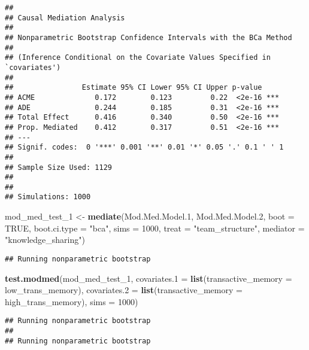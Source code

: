 \documentclass[]{article}
\newenvironment{Shaded}{\begin{snugshade}}{\end{snugshade}}
\newcommand{\DataTypeTok}[1]{\textcolor[rgb]{0.13,0.29,0.53}{#1}}
\newcommand{\DecValTok}[1]{\textcolor[rgb]{0.00,0.00,0.81}{#1}}
\newcommand{\FloatTok}[1]{\textcolor[rgb]{0.00,0.00,0.81}{#1}}
\newcommand{\KeywordTok}[1]{\textcolor[rgb]{0.13,0.29,0.53}{\textbf{#1}}}
\newcommand{\NormalTok}[1]{#1}
\newcommand{\OtherTok}[1]{\textcolor[rgb]{0.56,0.35,0.01}{#1}}
\newcommand{\StringTok}[1]{\textcolor[rgb]{0.31,0.60,0.02}{#1}}
\begin{document}
\begin{verbatim}
## 
## Causal Mediation Analysis 
## 
## Nonparametric Bootstrap Confidence Intervals with the BCa Method
## 
## (Inference Conditional on the Covariate Values Specified in `covariates')
## 
##                Estimate 95% CI Lower 95% CI Upper p-value    
## ACME              0.172        0.123         0.22  <2e-16 ***
## ADE               0.244        0.185         0.31  <2e-16 ***
## Total Effect      0.416        0.340         0.50  <2e-16 ***
## Prop. Mediated    0.412        0.317         0.51  <2e-16 ***
## ---
## Signif. codes:  0 '***' 0.001 '**' 0.01 '*' 0.05 '.' 0.1 ' ' 1
## 
## Sample Size Used: 1129 
## 
## 
## Simulations: 1000
\end{verbatim}

\begin{Shaded}
\begin{Highlighting}[]
\NormalTok{mod_med_test_}\DecValTok{1}\NormalTok{ <-}\StringTok{ }\KeywordTok{mediate}\NormalTok{(Mod.Med.Model}\FloatTok{.1}\NormalTok{, Mod.Med.Model}\FloatTok{.2}\NormalTok{,}
                             \DataTypeTok{boot =} \OtherTok{TRUE}\NormalTok{,}
                             \DataTypeTok{boot.ci.type =} \StringTok{"bca"}\NormalTok{,}
                             \DataTypeTok{sims =} \DecValTok{1000}\NormalTok{, }\DataTypeTok{treat =} \StringTok{"team_structure"}\NormalTok{, }
                             \DataTypeTok{mediator =} \StringTok{"knowledge_sharing"}\NormalTok{)}
\end{Highlighting}
\end{Shaded}

\begin{verbatim}
## Running nonparametric bootstrap
\end{verbatim}

\begin{Shaded}
\begin{Highlighting}[]
\KeywordTok{test.modmed}\NormalTok{(mod_med_test_}\DecValTok{1}\NormalTok{, }\DataTypeTok{covariates.1 =} \KeywordTok{list}\NormalTok{(}\DataTypeTok{transactive_memory =}\NormalTok{ low_trans_memory), }\DataTypeTok{covariates.2 =} \KeywordTok{list}\NormalTok{(}\DataTypeTok{transactive_memory =}\NormalTok{ high_trans_memory), }\DataTypeTok{sims =} \DecValTok{1000}\NormalTok{)}
\end{Highlighting}
\end{Shaded}

\begin{verbatim}
## Running nonparametric bootstrap
## 
## Running nonparametric bootstrap
\end{verbatim}
\end{document}
